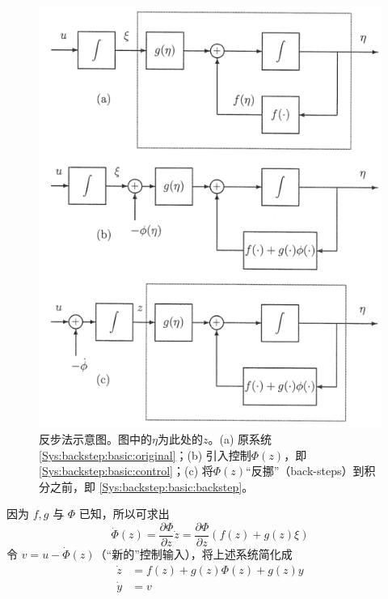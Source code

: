 \begin{figure}[htbp]
    \centering
    \includegraphics[width=0.5\linewidth]{figure/adaptive/backstepping.png}
    \caption{反步法示意图。图中的$\eta$为此处的$z$。(a) 原系统 \eqref{Sys:backstep:basic:original}；(b) 引入控制$\Phi(z)$，即 \eqref{Sys:backstep:basic:control}；(c) 将$\Phi(z)$“反挪”（back-steps）到积分之前，即 \eqref{Sys:backstep:basic:backstep}。}
    \label{fig:backstepping}
\end{figure}

因为 $f, g$ 与 $\Phi$ 已知，所以可求出
\[ \dot{\Phi} (z) = \frac{\partial \Phi}{\partial z} \dot{z} = \frac{\partial
   \Phi}{\partial z} (f (z) + g (z) \xi) \]
令 $v = u - \dot{\Phi} (z)$（“新的”控制输入），将上述系统简化成
\begin{align*}
  \dot{z} & = f (z) + g (z) \Phi (z) + g (z) y\\
  \dot{y} & = v
\end{align*}

